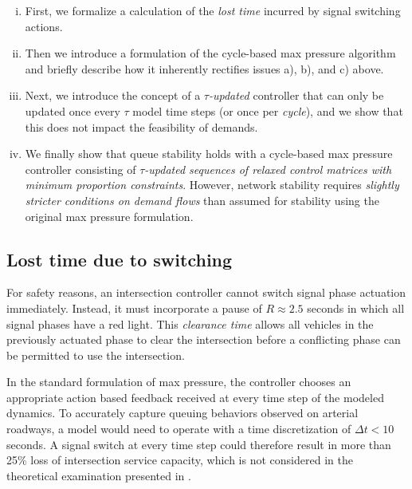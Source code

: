 \begin{enumerate}[i.]
\item First, we formalize a calculation of the \emph{lost time} incurred by signal switching actions. 
\item Then we introduce a formulation of the cycle-based max pressure algorithm and briefly describe how it inherently rectifies issues a), b), and c) above. 
\item Next, we introduce the concept of a \emph{$\tau$-updated} controller that can only be updated once every $\tau$ model time steps (or once per \emph{cycle}), and we show that this does not impact the feasibility of demands.  
\item We finally show that queue stability holds with a cycle-based max pressure controller consisting of \emph{$\tau$-updated sequences of relaxed control matrices with minimum proportion constraints}. However, network stability requires \emph{slightly stricter conditions on demand flows} than assumed for stability using the original max pressure formulation.  
\end{enumerate}

%



 
\subsection*{Lost time due to switching}
For safety reasons, an intersection controller cannot switch signal phase actuation immediately. Instead, it must incorporate a pause of $R\approx2.5$ seconds in which all signal phases have a red light. This \emph{clearance time} allows all vehicles in the previously actuated phase to clear the intersection before a conflicting phase can be permitted to use the intersection. 

In the standard formulation of max pressure, the controller chooses an appropriate action based feedback received at every time step of the modeled dynamics. To accurately capture queuing behaviors observed on arterial roadways, a model would need to operate with a time discretization of $\Delta t< 10$ seconds. A signal switch at every time step could therefore result in more than 25\% loss of intersection service capacity, which is not considered in the theoretical examination presented in \cite{MaxPressureStochastic}. 

